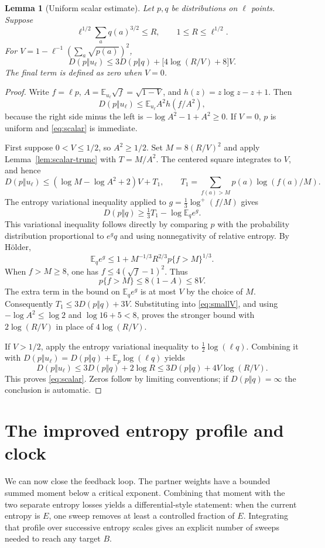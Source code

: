 \documentclass[11pt]{article}
\numberwithin{equation}{section}
\newtheorem{lemma}[theorem]{Lemma}
\theoremstyle{definition}\newtheorem{definition}[theorem]{Definition}
\theoremstyle{remark}\newtheorem{remark}[theorem]{Remark}
\newcommand{\E}{\mathbb E}
\begin{document}
\begin{lemma}[Uniform scalar estimate]\label{lem:scalar}
Let $p,q$ be distributions on $\ell$ points. Suppose
\[
 \ell^{1/2}\sum_a q(a)^{3/2}\le R,
 \qquad 1\le R\le\ell^{1/2}.
\]
For $V=1-\ell^{-1}(\sum_a\sqrt{p(a)})^2$,
\begin{equation}\label{eq:scalar}
 D(p\Vert u_\ell)
 \le3D(p\Vert q)+\bigl[4\log(R/V)+8\bigr]V.
\end{equation}
The final term is defined as zero when $V=0$.
\end{lemma}
\begin{proof}
Write $f=\ell p$, $A=\E_{u_\ell}\sqrt f=\sqrt{1-V}$, and
$h(z)=z\log z-z+1$. Then
\[
 D(p\Vert u_\ell)\le\E_{u_\ell}A^2h(f/A^2),
\]
because the right side minus the left is $-\log A^2-1+A^2\ge0$.
If $V=0$, $p$ is uniform and \eqref{eq:scalar} is immediate.

First suppose $0<V\le1/2$, so $A^2\ge1/2$. Set
$M=8(R/V)^2$ and apply Lemma~\ref{lem:scalar-trunc} with $T=M/A^2$.
The centered square integrates to $V$, and hence
\begin{equation}\label{eq:smallV}
 D(p\Vert u_\ell)\le(\log M-\log A^2+2)V+T_1,
 \qquad
 T_1=\sum_{f(a)>M}p(a)\log(f(a)/M).
\end{equation}
The entropy variational inequality applied to
$g=\frac13\log^+(f/M)$ gives
\[
 D(p\Vert q)\ge\tfrac13T_1-\log\E_qe^g.
\]
This variational inequality follows directly by comparing $p$ with the
probability distribution proportional to $e^gq$ and using nonnegativity
of relative entropy. By H\"older,
\[
 \E_q e^g\le1+M^{-1/3}R^{2/3}p\{f>M\}^{1/3}.
\]
When $f>M\ge8$, one has $f\le4(\sqrt f-1)^2$. Thus
\[
 p\{f>M\}\le8(1-A)\le8V.
\]
The extra term in the bound on $\E_qe^g$ is at most $V$ by the choice of
$M$. Consequently $T_1\le3D(p\Vert q)+3V$. Substituting into
\eqref{eq:smallV}, and using $-\log A^2\le\log2$ and
$\log16+5<8$, proves the stronger bound with $2\log(R/V)$ in place of
$4\log(R/V)$.

If $V>1/2$, apply the entropy variational inequality to
$\frac12\log(\ell q)$. Combining it with
$D(p\Vert u_\ell)=D(p\Vert q)+\E_p\log(\ell q)$ yields
\[
 D(p\Vert u_\ell)\le3D(p\Vert q)+2\log R
 \le3D(p\Vert q)+4V\log(R/V).
\]
This proves \eqref{eq:scalar}. Zeros follow by limiting conventions; if
$D(p\Vert q)=\infty$ the conclusion is automatic.
\end{proof}

\section{The improved entropy profile and clock}
\label{sec:entropy}
We can now close the feedback loop.  The partner weights have a bounded summed
moment below a critical exponent.  Combining that moment with the two separate
entropy losses yields a differential-style statement: when the current entropy
is $E$, one sweep removes at least a controlled fraction of $E$.  Integrating
that profile over successive entropy scales gives an explicit number of sweeps
needed to reach any target $B$.
\end{document}
